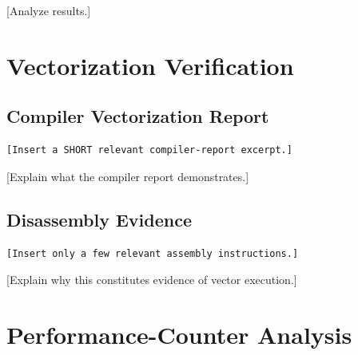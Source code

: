 \documentclass[11pt]{article}
\begin{document}

[Analyze results.]

\section{Vectorization Verification}

%
%
%

\subsection{Compiler Vectorization Report}

\begin{lstlisting}
[Insert a SHORT relevant compiler-report excerpt.]
\end{lstlisting}

[Explain what the compiler report demonstrates.]

\subsection{Disassembly Evidence}

\begin{lstlisting}
[Insert only a few relevant assembly instructions.]
\end{lstlisting}


[Explain why this constitutes evidence of vector execution.]

\section{Performance-Counter Analysis}

%
\end{document}

